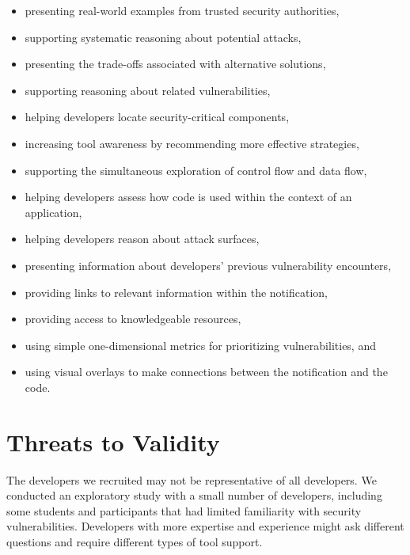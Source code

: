 \documentclass[conference]{IEEEtran}
\begin{document}
\begin{itemize}
\item presenting real-world examples from trusted security authorities,
\item supporting systematic reasoning about potential attacks,
\item presenting the trade-offs associated with alternative solutions,
\item supporting reasoning about related vulnerabilities,
\item helping developers locate security-critical components,
\item increasing tool awareness by recommending more effective strategies,
\item supporting the simultaneous exploration of control flow and data flow,
\item helping developers assess how code is used within the context of an application,
\item helping developers reason about attack surfaces,
\item presenting information about developers' previous vulnerability encounters,
\item providing links to relevant information within the notification,
\item providing access to knowledgeable resources,
\item using simple one-dimensional metrics for prioritizing vulnerabilities, and
%
\item using visual overlays to make connections between the notification and the code.


\end{itemize}
%

\section{Threats to Validity}
\label{limits}
The developers we recruited may not be representative of all developers.
We conducted an exploratory study with a small number of developers, including some students and participants that had limited familiarity with security vulnerabilities.
Developers with more expertise and experience might ask different questions and require different types of tool support.
\end{document}
